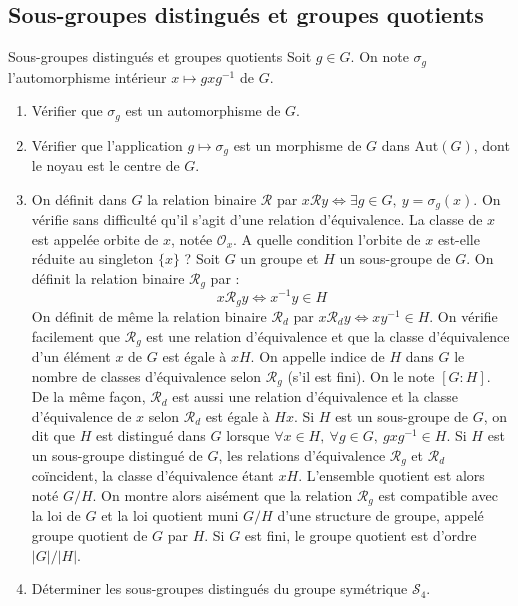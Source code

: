 \documentclass[french,a4paper]{article}
\newcommand{\inv}{^{-1}}
\theoremstyle{plain}
\theoremstyle{definition}
\theoremstyle{remark}
\begin{document}
\subsection{Sous-groupes distingués et groupes quotients}
\begin{ex}{Sous-groupes distingués et groupes quotients}
	Soit $g\in G$. On note $\sigma_g$ l'automorphisme intérieur $x\mapsto gxg\inv$ de $G$.
	\begin{enumerate}
		\item Vérifier que $\sigma_g$ est un automorphisme de $G$.
		\item Vérifier que l'application $g\mapsto\sigma_g$ est un morphisme de $G$ dans $\text{Aut}(G)$, dont le noyau est le centre de $G$.
		\item On définit dans $G$ la relation binaire $\mathcal{R}$ par $x\mathcal{R}y\iff \exists g\in G,\ y=\sigma_g(x)$. On vérifie sans difficulté qu'il s'agit d'une relation d'équivalence. La classe de $x$ est appelée orbite de $x$, notée $\mathcal{O}_x$. A quelle condition l'orbite de $x$ est-elle réduite au singleton $\{x\}$ ? Soit $G$ un groupe et $H$ un sous-groupe de $G$. On définit la relation binaire $\mathcal{R}_g$ par : $$x\mathcal{R}_gy\iff x\inv y\in H$$ On définit de même la relation binaire $\mathcal{R}_d$ par $x\mathcal{R}_dy\iff xy\inv\in H$. On vérifie facilement que $\mathcal{R}_g$ est une relation d'équivalence et que la classe d'équivalence d'un élément $x$ de $G$ est égale à $xH$. On appelle indice de $H$ dans $G$ le nombre de classes d'équivalence selon $\mathcal{R}_g$ (s'il est fini). On le note $[G:H]$. De la même façon, $\mathcal{R}_d$ est aussi une relation d'équivalence et la classe d'équivalence de $x$ selon $\mathcal{R}_d$ est égale à $Hx$. Si $H$ est un sous-groupe de $G$, on dit que $H$ est distingué dans $G$ lorsque $\forall x\in H,\ \forall g\in G,\ gxg\inv\in H$. Si $H$ est un sous-groupe distingué de $G$, les relations d'équivalence $\mathcal{R}_g$ et $\mathcal{R}_d$ coïncident, la classe d'équivalence étant $xH$. L'ensemble quotient est alors noté $G/H$. On montre alors aisément que la relation $\mathcal{R}_g$ est compatible avec la loi de $G$ et la loi quotient muni $G/H$ d'une structure de groupe, appelé groupe quotient de $G$ par $H$. Si $G$ est fini, le groupe quotient est d'ordre $\lvert G\rvert/\lvert H\rvert$.
		\item Déterminer les sous-groupes distingués du groupe symétrique $\mathcal{S}_4$.
	\end{enumerate}
\end{ex}
\end{document}
